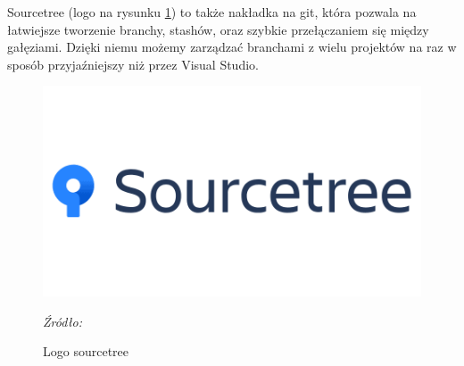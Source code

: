 \documentclass[12pt,oneside]{report}
\begin{document}
Sourcetree (logo na rysunku \ref{SourcetreeLogo}) to także nakładka na git, która pozwala na łatwiejsze tworzenie branchy, stashów, oraz szybkie przełączaniem się między gałęziami. Dzięki niemu możemy zarządzać branchami z wielu projektów na raz w sposób przyjaźniejszy niż przez Visual Studio.\cite{sourcetree}
\begin{figure}[H]
	\centering
	\includegraphics[scale=0.3]{sourcetree}
	\caption{Logo sourcetree}
	\textit{Źródło: \cite{sourcetree}}
	\label{SourcetreeLogo}
\end{figure}
\end{document}
